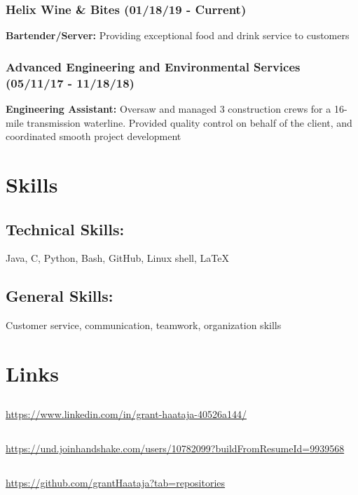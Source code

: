 \documentclass{article}
\begin{document}
\subsubsection{Helix Wine \& Bites (01/18/19 - Current)} 
\textbf{Bartender/Server:} Providing exceptional food and drink service to customers

\subsubsection{Advanced Engineering and Environmental Services (05/11/17 - 11/18/18)}
\textbf{Engineering Assistant:} 
Oversaw and managed 3 construction crews for a 16-mile transmission waterline. Provided quality control on behalf of the client, and coordinated smooth project development

\section{Skills}

\subsection{Technical Skills:}
Java, C, Python, Bash, GitHub, Linux shell, {\LaTeX}

\subsection{General Skills:}
Customer service, communication, teamwork, organization skills

\section{Links}

\subsection{}
\url{https://www.linkedin.com/in/grant-haataja-40526a144/}

\subsection{}
\url{https://und.joinhandshake.com/users/10782099?buildFromResumeId=9939568}

\subsection{}
\url{https://github.com/grantHaataja?tab=repositories}
\end{document}
